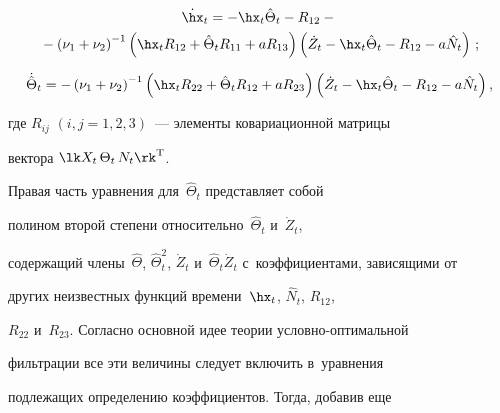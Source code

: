 \noindent


\begin{multline*}


\dot{\hx}_t =-\hx_t\hat\Theta_t - R_{12} -{}\\


{}- \left(\nu_1+\nu_2\right)^{-1} \left(\hx_t


  R_{12} +\hat\Theta_t R_{11} + aR_{13}\right) \left(\dot Z_t -\hx_t\hat\Theta_t


 -R_{12}-a\hat N_t\right)\,; %


\end{multline*}





\vspace*{-6pt}





\noindent


\begin{equation*}


\dot{\hat\Theta}_t =-\left(\nu_1+\nu_2\right)^{-1} \left(


\hx_t R_{22} +\hat\Theta_t R_{12} +


  a R_{23}\right)\left(\dot Z_t -\hx_t \hat\Theta_t - R_{12}-a\hat N_t\right),




  \end{equation*}


где  $R_{ij}$ $(i,j=1,2,3)$~--- элементы ковариационной матрицы


вектора  $\lk X_t\, \Theta_t\, N_t\rk^{\mathrm{T}}$.


Правая часть уравнения для~$\hat\Theta_t$ представляет собой


полином второй степени относительно~$\hat \Theta_t$ и~$\dot Z_t$, 


содержащий члены~$\hat\Theta$, $\hat\Theta_t^2$, $\dot


Z_t$ и~$\hat\Theta_t \dot Z_t$ с~коэффициентами, зависящими от


других неизвестных функций времени~$\hx_t$, $\hat N_t$, $R_{12}$,


$R_{22}$ и~$R_{23}$. Согласно основной идее теории услов\-но-оп\-ти\-маль\-ной 


фильт\-ра\-ции все эти величины следует включить в~уравнения 


подлежащих определению коэффициентов. Тогда, добавив еще


